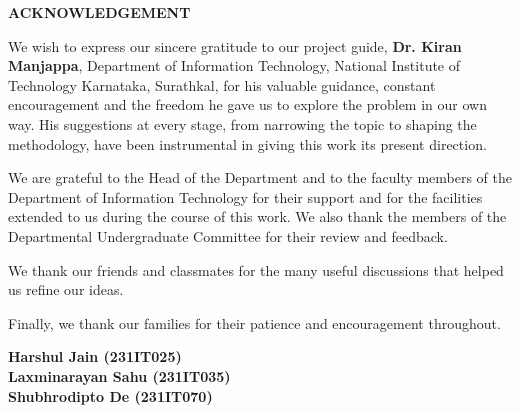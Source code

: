 \begin{center}
	\textbf{{\Large ACKNOWLEDGEMENT}}\\
    \thispagestyle{empty}
\end{center}
\justifying
We wish to express our sincere gratitude to our project guide, \textbf{Dr. Kiran Manjappa}, Department of Information Technology, National Institute of Technology Karnataka, Surathkal, for his valuable guidance, constant encouragement and the freedom he gave us to explore the problem in our own way. His suggestions at every stage, from narrowing the topic to shaping the methodology, have been instrumental in giving this work its present direction.

We are grateful to the Head of the Department and to the faculty members of the Department of Information Technology for their support and for the facilities extended to us during the course of this work. We also thank the members of the Departmental Undergraduate Committee for their review and feedback.

We thank our friends and classmates for the many useful discussions that helped us refine our ideas.

Finally, we thank our families for their patience and encouragement throughout.

\vspace{1.5em}
\begin{flushright}
	\textbf{Harshul Jain (231IT025)}\\
	\textbf{Laxminarayan Sahu (231IT035)}\\
	\textbf{Shubhrodipto De (231IT070)}
\end{flushright}
\clearpage